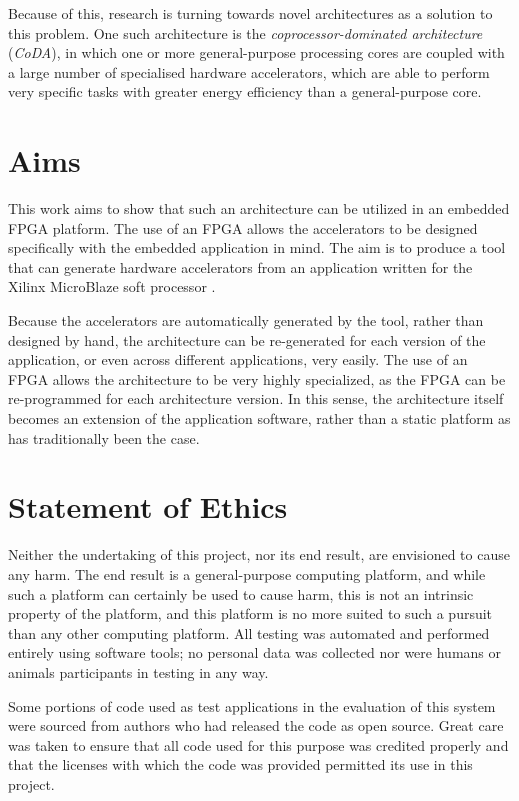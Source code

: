 \documentclass{UoYCSproject}
\begin{document}
Because of this, research is turning towards novel architectures as a solution to this problem.
One such architecture is the \textit{coprocessor-dominated architecture} (\textit{CoDA}), in which one or more general-purpose
processing cores are coupled with a large number of specialised hardware accelerators, which are able to perform very specific
tasks with greater energy efficiency than a general-purpose core.

\section{Aims}

This work aims to show that such an architecture can be utilized in an embedded FPGA platform.
The use of an FPGA allows the accelerators to be designed specifically with the embedded application in mind.
The aim is to produce a tool that can generate hardware accelerators from an application written for the Xilinx MicroBlaze
soft processor \cite{microblaze}.

Because the accelerators are automatically generated by the tool, rather than designed by hand, the architecture
can be re-generated for each version of the application, or even across different applications, very easily.
The use of an FPGA allows the architecture to be very highly specialized, as the FPGA can be re-programmed for each architecture
version. In this sense, the architecture itself becomes an extension of the application software, rather than a static
platform as has traditionally been the case.

\section{Statement of Ethics}

Neither the undertaking of this project, nor its end result, are envisioned to cause any harm. The end result is
a general-purpose computing platform, and while such a platform can certainly be used to cause harm, this is not an intrinsic
property of the platform, and this platform is no more suited to such a pursuit than any other computing platform.
All testing was automated and performed entirely using software tools; no personal data was collected nor were humans
or animals participants in testing in any way.

Some portions of code used as test applications in the evaluation of this system were sourced
from authors who had released the code as open source. Great care was taken to ensure that all
code used for this purpose was credited properly and that the licenses with which the code was
provided permitted its use in this project.
\end{document}
